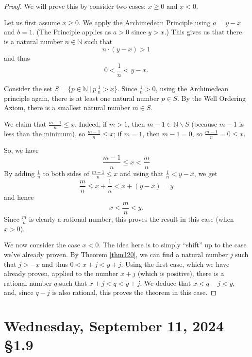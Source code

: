 \documentclass[12pt]{amsart}
\def\We{Wednesday}
\newcommand{\N}{\mathbb{N}}
\numberwithin{equation}{section}
\theoremstyle{plain} %
\newcommand{\Sept}[3]{\section{#2, September #1, 2024 \quad \S#3}}
\theoremstyle{definition}
\theoremstyle{remark}
\begin{document}
\begin{proof} We will prove this by consider two cases: $x \geq 0$ and $x < 0$.

Let us first assume $x \geq 0$.
We apply the Archimedean Principle using $a = y-x$ and $b = 1$. (The Principle applies as
$a > 0$ since $y> x$.) This gives us that there is a natural number $n \in \N$ such that
$$
n \cdot (y-x) > 1
$$
and thus
$$
0 < \frac{1}{n} < y-x.
$$

Consider the set $S=\{p\in \N \ | \ p \, \frac{1}{n} >x \}$.
Since $\frac{1}{n} > 0$, using the Archimedean principle again, there is at least one natural number $p\in S$. By the Well Ordering Axiom, there is a smallest natural number $m\in S$. 

We claim that $\frac{m-1}{n} \leq x$. Indeed, if $m>1$, then $m-1\in \N \smallsetminus S$ (because $m-1$ is less than the minimum), so $\frac{m-1}{n}\leq x$; if $m=1$, then $m-1=0$, so $\frac{m-1}{n} = 0 \leq x$.

So, we have
$$
\frac{m-1}{n} \leq x< \frac{m}{n}
$$
By adding $\frac{1}{n}$ to both sides of $\frac{m-1}{n} \leq x$ and using that $\frac{1}{n} < y- x$, we get
$$
\frac{m}{n} \leq x + \frac{1}{n} < x + (y -x) = y
$$
and hence
$$
x < \frac{m}{n} < y.
$$
Since $\frac{m}{n}$ is clearly a rational number, this proves the result in this case (when $x > 0$). 

We now consider the case $x < 0$. The idea here is to simply ``shift'' up to the case we've already proven. 
By Theorem \ref{thm120}, we can find a natural number $j$ such that $j > -x$ and thus $0 < x +j < y +j$. Using the first case, which we have already proven,
applied 
to the number $x + j$ (which is positive), there is a rational number $q$ such that $x+j < q < y+j$. We deduce that $x < q-j < y$, and, since $q - j$ is also
rational, this proves the theorem in this case.
\end{proof}

\newpage


\Sept{11}{\We}{1.9}

	
\end{document}

